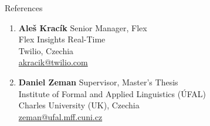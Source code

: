 \documentclass{resume} %
\begin{document}

\begin{rSection}{References}

    \begin{enumerate}
        \item \textbf{Ale\v{s} Krac\'{i}k} \hfill Senior Manager, Flex\\
            Flex Insights Real-Time\\
            Twilio, Czechia\\
            \faEnvelope \hspace{0.5mm} \href{mailto:akracik@twilio.com}{akracik@twilio.com}

        \item \textbf{Daniel Zeman} \hfill Supervisor, Master's Thesis\\
            Institute of Formal and Applied Linguistics ({\'U}FAL)\\
            Charles University (UK), Czechia\\
            \faEnvelope \hspace{0.5mm} \href{mailto:zeman@ufal.mff.cuni.cz}{zeman@ufal.mff.cuni.cz}
    \end{enumerate}

\end{rSection}
\end{document}
